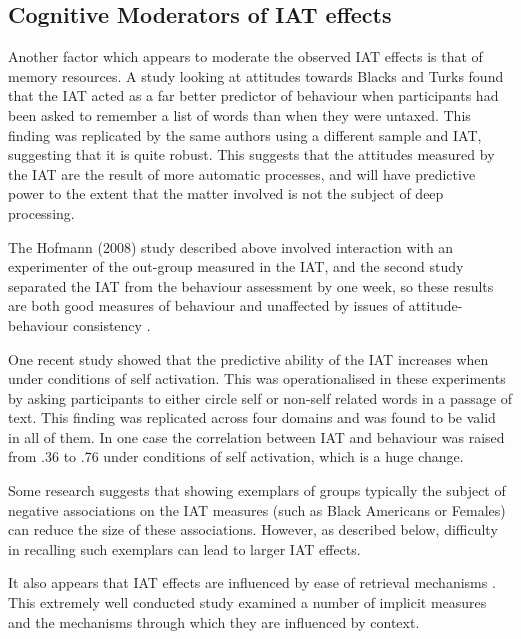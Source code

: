 \subsection{Cognitive Moderators of IAT effects}
\label{sec:cogn-moder-iat}



Another factor which appears to moderate the observed IAT effects is that of memory resources. A study looking at attitudes towards Blacks and Turks \cite{Hofmann2008a} found that the IAT acted as a far better predictor of behaviour when participants had been asked to remember a list of words than when they were untaxed. This finding was replicated by the same authors using a different sample and IAT, suggesting that it is quite robust.  This suggests that the attitudes measured by the IAT are the result of more automatic processes, and will have predictive power to the extent that the matter involved is not the subject of deep processing. 

The Hofmann (2008) study described above involved interaction with an experimenter of the out-group measured in the IAT, and the second study separated the IAT from the behaviour assessment by one week, so these results are both good measures of behaviour and unaffected by  issues of attitude-behaviour consistency . 

One recent study \cite{Perugini2007} showed that the predictive ability of the IAT increases when under conditions of self activation. This was operationalised in these experiments by asking participants to either circle self or non-self related words in a passage of text. This finding was replicated across four domains and was found to be valid in all of them. In one case the correlation between IAT and behaviour was raised from .36 to .76 under conditions of self activation, which is a huge change. 

Some research \cite{Dasgupta2001} suggests that showing exemplars of groups typically the subject of negative associations on the IAT measures (such as Black Americans or Females) can reduce the size of these associations. However, as described below, difficulty in recalling such exemplars can lead to larger IAT effects. 

It also appears that IAT effects are influenced by ease of retrieval mechanisms \cite{Gawronski2005}. This extremely well conducted study examined a number of implicit measures and the mechanisms through which they are influenced by context. 

